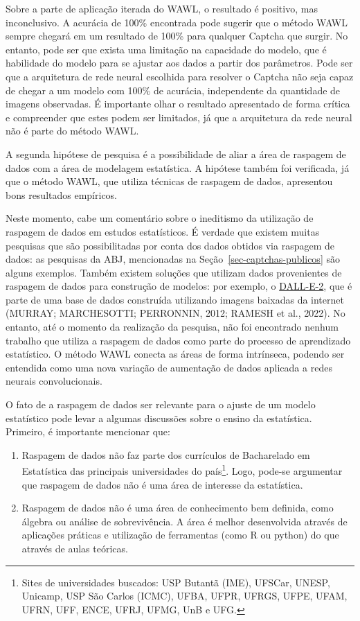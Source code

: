 \documentclass[12pt,twoside,brazilian]{book}
\providecommand{\tightlist}{%
  \setlength{\itemsep}{0pt}\setlength{\parskip}{0pt}}
\begin{document}
Sobre a parte de aplicação iterada do WAWL, o resultado é positivo, mas
inconclusivo. A acurácia de 100\% encontrada pode sugerir que o método
WAWL sempre chegará em um resultado de 100\% para qualquer Captcha que
surgir. No entanto, pode ser que exista uma limitação na capacidade do
modelo, que é habilidade do modelo para se ajustar aos dados a partir
dos parâmetros. Pode ser que a arquitetura de rede neural escolhida para
resolver o Captcha não seja capaz de chegar a um modelo com 100\% de
acurácia, independente da quantidade de imagens observadas. É importante
olhar o resultado apresentado de forma crítica e compreender que estes
podem ser limitados, já que a arquitetura da rede neural não é parte do
método WAWL.

A segunda hipótese de pesquisa é a possibilidade de aliar a área de
raspagem de dados com a área de modelagem estatística. A hipótese também
foi verificada, já que o método WAWL, que utiliza técnicas de raspagem
de dados, apresentou bons resultados empíricos.

Neste momento, cabe um comentário sobre o ineditismo da utilização de
raspagem de dados em estudos estatísticos. É verdade que existem muitas
pesquisas que são possibilitadas por conta dos dados obtidos via
raspagem de dados: as pesquisas da ABJ, mencionadas na
Seção~\ref{sec-captchas-publicos} são alguns exemplos. Também existem
soluções que utilizam dados provenientes de raspagem de dados para
construção de modelos: por exemplo, o
\href{https://openai.com/dall-e-2/}{DALL-E-2}, que é parte de uma base
de dados construída utilizando imagens baixadas da internet (MURRAY;
MARCHESOTTI; PERRONNIN, 2012; RAMESH et al., 2022). No entanto, até o
momento da realização da pesquisa, não foi encontrado nenhum trabalho
que utiliza a raspagem de dados como parte do processo de aprendizado
estatístico. O método WAWL conecta as áreas de forma intrínseca, podendo
ser entendida como uma nova variação de aumentação de dados aplicada a
redes neurais convolucionais.

O fato de a raspagem de dados ser relevante para o ajuste de um modelo
estatístico pode levar a algumas discussões sobre o ensino da
estatística. Primeiro, é importante mencionar que:

\begin{enumerate}
\def\labelenumi{\arabic{enumi}.}
\tightlist
\item
  Raspagem de dados não faz parte dos currículos de Bacharelado em
  Estatística das principais universidades do país\footnote{Sites de
    universidades buscados: USP Butantã (IME), UFSCar, UNESP, Unicamp,
    USP São Carlos (ICMC), UFBA, UFPR, UFRGS, UFPE, UFAM, UFRN, UFF,
    ENCE, UFRJ, UFMG, UnB e UFG.}. Logo, pode-se argumentar que raspagem
  de dados não é uma área de interesse da estatística.
\item
  Raspagem de dados não é uma área de conhecimento bem definida, como
  álgebra ou análise de sobrevivência. A área é melhor desenvolvida
  através de aplicações práticas e utilização de ferramentas (como R ou
  python) do que através de aulas teóricas.
\end{enumerate}
\end{document}
